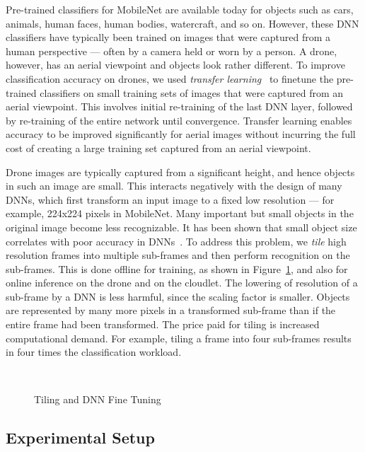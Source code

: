 Pre-trained classifiers for MobileNet are available today for objects such as
cars, animals, human faces, human bodies, watercraft, and so on.  However, these
DNN classifiers have typically been trained on images that were captured from a
human perspective --- often by a camera held or worn by a person.  A drone,
however, has an aerial viewpoint and objects look rather different.  To improve
classification accuracy on drones, we used {\em transfer learning}~\cite{Yosinski2014} to finetune
the pre-trained classifiers on small training sets of images that were captured
from an aerial viewpoint.  This involves initial re-training of the last DNN
layer, followed by re-training of the entire network until convergence. Transfer
learning enables accuracy to be improved significantly for aerial images without
incurring the full cost of creating a large training set captured from an aerial
viewpoint.

Drone images are typically captured from a significant height, and hence objects
in such an image are small.  This interacts negatively with the design of many
DNNs, which first transform an input image to a fixed low resolution --- for
example, 224x224 pixels in MobileNet. Many important but small objects in the
original image become less recognizable.  It has been shown that small object
size correlates with poor accuracy in DNNs~\cite{Huang2017}.  To address this
problem, we {\em tile} high resolution frames into multiple sub-frames and then
perform recognition on the sub-frames.  This is done offline for training, as
shown in Figure~\ref{fig:tiling}, and also for online inference on the drone and
on the cloudlet.  The lowering of resolution of a sub-frame by a DNN is less
harmful, since the scaling factor is smaller.  Objects are represented by many
more pixels in a transformed sub-frame than if the entire frame had been
transformed.  The price paid for tiling is increased computational demand.  For
example, tiling a frame into four sub-frames results in four times the
classification workload.

\begin{figure}
  \hspace{-0.1in}
\\
\caption{Tiling and DNN Fine Tuning}
\label{fig:tiling}
\end{figure}

\subsection{Experimental Setup}

